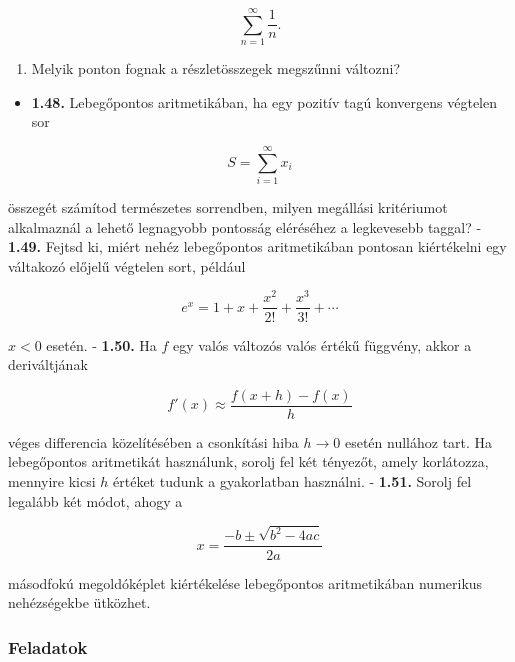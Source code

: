 \documentclass[
  magyar,
  11pt]{article}
\providecommand{\tightlist}{%
  \setlength{\itemsep}{0pt}\setlength{\parskip}{0pt}}
\begin{document}
\[\sum_{n=1}^{\infty} \frac{1}{n}.\]

\begin{enumerate}
\def\labelenumi{(\alph{enumi})}
\setcounter{enumi}{1}
\tightlist
\item
  Melyik ponton fognak a részletösszegek megszűnni változni?
\end{enumerate}

\begin{itemize}
\tightlist
\item
  \textbf{1.48.} Lebegőpontos aritmetikában, ha egy pozitív tagú
  konvergens végtelen sor
\end{itemize}

\[S = \sum_{i=1}^{\infty} x_i\]

összegét számítod természetes sorrendben, milyen megállási kritériumot
alkalmaznál a lehető legnagyobb pontosság eléréséhez a legkevesebb
taggal? - \textbf{1.49.} Fejtsd ki, miért nehéz lebegőpontos
aritmetikában pontosan kiértékelni egy váltakozó előjelű végtelen sort,
például

\[e^x = 1 + x + \frac{x^2}{2!} + \frac{x^3}{3!} + \cdots\]

\(x < 0\) esetén. - \textbf{1.50.} Ha \(f\) egy valós változós valós
értékű függvény, akkor a deriváltjának

\[f'(x) \approx \frac{f(x+h) - f(x)}{h}\]

véges differencia közelítésében a csonkítási hiba \(h \to 0\) esetén
nullához tart. Ha lebegőpontos aritmetikát használunk, sorolj fel két
tényezőt, amely korlátozza, mennyire kicsi \(h\) értéket tudunk a
gyakorlatban használni. - \textbf{1.51.} Sorolj fel legalább két módot,
ahogy a

\[x = \frac{-b \pm \sqrt{b^2 - 4ac}}{2a}\]

másodfokú megoldóképlet kiértékelése lebegőpontos aritmetikában
numerikus nehézségekbe ütközhet.

\subsubsection{Feladatok}\label{feladatok}
\end{document}
